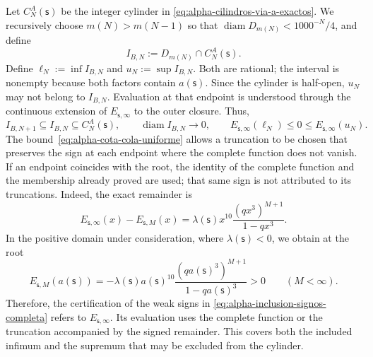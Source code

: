 Let \(C_N^A(\mathsf s)\) be the integer cylinder in
\eqref{eq:alpha-cilindros-via-a-exactos}. We recursively choose
\(m(N)>m(N-1)\) so that
\(\operatorname{diam}D_{m(N)}<1000^{-N}/4\), and define
\begin{equation}
I_{B,N}:=D_{m(N)}\cap C_N^A(\mathsf s).
 \label{eq:alpha-intervalos-b-completos}
\end{equation}
Define
\(\ell_N:=\inf I_{B,N}\) and \(u_N:=\sup I_{B,N}\). Both are rational;
the interval is nonempty because both factors contain
\(a(\mathsf s)\). Since the cylinder is half-open, \(u_N\) may not
belong to \(I_{B,N}\). Evaluation at that endpoint is understood through
the continuous extension of \(E_{\mathsf s,\infty}\) to the outer closure. Thus,
\begin{equation}
 I_{B,N+1}\subseteq I_{B,N}\subseteq C_N^A(\mathsf s),
 \qquad \operatorname{diam}I_{B,N}\longrightarrow0,
 \qquad E_{\mathsf s,\infty}(\ell_N)\leq0\leq
 E_{\mathsf s,\infty}(u_N).
 \label{eq:alpha-inclusion-signos-completa}
\end{equation}
The bound~\eqref{eq:alpha-cota-cola-uniforme} allows a
truncation to be chosen that preserves the sign at each endpoint where the complete function
does not vanish. If an endpoint coincides with the root, the identity of
the complete function and the membership already proved are used; that same
sign is not attributed to its truncations. Indeed, the exact remainder is
\[
 E_{\mathsf s,\infty}(x)-E_{\mathsf s,M}(x)
 =\lambda(\mathsf s)x^{10}
   \frac{(qx^3)^{M+1}}{1-qx^3}.
\]
In the positive domain under consideration, where \(\lambda(\mathsf s)<0\), we
obtain at the root
\[
 E_{\mathsf s,M}(a(\mathsf s))
 =-\lambda(\mathsf s)a(\mathsf s)^{10}
   \frac{(qa(\mathsf s)^3)^{M+1}}{1-qa(\mathsf s)^3}>0
 \qquad(M<\infty).
\]
Therefore, the certification of the weak signs in
\eqref{eq:alpha-inclusion-signos-completa} refers to
\(E_{\mathsf s,\infty}\). Its evaluation uses the complete function or the
truncation accompanied by the signed remainder. This covers both the included
infimum and the supremum that may be excluded from the cylinder.

